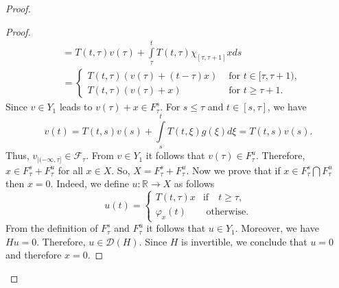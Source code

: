 \documentclass[reqno]{amsart}
\begin{document}
\begin{proof}
\begin{proof}
\begin{align*}
 &=T(t,\tau)v(\tau)+\displaystyle\int\limits_{\tau}^{t}T(t,\tau)\chi_{[\tau, \tau+1]}x ds\\
&=\begin{cases}
T(t,\tau)(v(\tau)+(t-\tau)x)& \text{ for } t\in [\tau, \tau+1),\\
T(t,\tau)(v(\tau)+x)& \text{ for } t\ge \tau+1.  
\end{cases}
 \end{align*}
Since $v \in Y_1$ leads to $v(\tau)+x \in F^s_{\tau}$. For $s \leq \tau$ and $t \in [s,\tau]$, we have
$$v(t)= T(t,s)v(s)+\displaystyle\int\limits_{s}^{t}T(t,\xi)g(\xi) d\xi=T(t,s)v(s).$$
Thus, $v_{|(-\infty,\tau]} \in \mathcal{F}_{\tau}$. From $v \in Y_1$ it follows that $v(\tau) \in F^u_{\tau}$.
Therefore, $x \in F^s_{\tau}+ F^u_{\tau}$ for all $x\in X$. So, $X=F^s_{\tau}+ F^u_{\tau}$.
Now we prove that if $x \in F^s_{\tau}\bigcap F^u_{\tau}$ then $x=0$. Indeed, we define $u:\mathbb{R} \rightarrow X$ as follows
 $$
 u(t)=
 \begin{cases}
 T(t,\tau)x & \text{if}\quad t\geq \tau,\\
\varphi_x(t) & \text{ otherwise}.
 \end{cases}
 $$
From the definition of $F^s_{\tau}$ and $F^u_{\tau}$ it follows that $u \in Y_1$. Moreover, we have $Hu=0$. 
Therefore, $u \in \mathcal{D}(H)$. Since $H$ is invertible, we conclude that  $u=0$ and therefore $x=0$.
\end{proof}


\end{proof}
\end{document}
